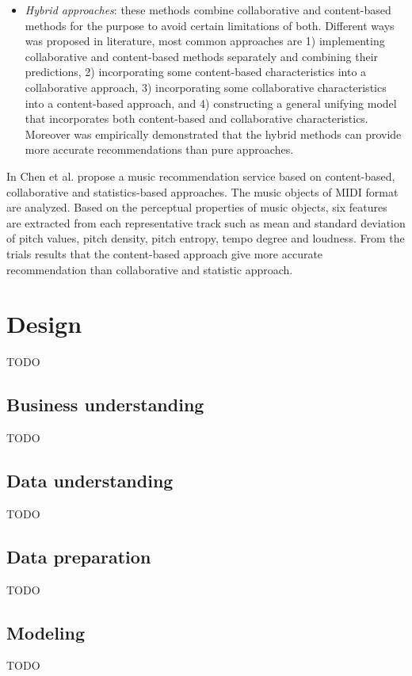 \documentclass[paper=a4, fontsize=11pt]{scrartcl} %
\numberwithin{equation}{section} %
\numberwithin{figure}{section} %
\numberwithin{table}{section} %
\begin{document}
\begin{itemize}
  \item \textit{Hybrid approaches}: these methods combine collaborative
and content-based methods for the purpose to avoid certain limitations of both.
Different ways was proposed in literature, most common approaches are 1)
implementing collaborative and content-based methods separately and combining
their predictions, 2) incorporating some content-based characteristics into a
collaborative approach, 3) incorporating some collaborative characteristics into
a content-based approach, and 4) constructing a general unifying model that
incorporates both content-based and collaborative characteristics. Moreover was
empirically demonstrated that the hybrid methods can provide more accurate
recommendations than pure approaches.
\end{itemize}

In \cite{ChenChen} Chen et al. propose a music recommendation service based on
content-based, collaborative and statistics-based approaches. The music objects
of MIDI format are analyzed. Based on the perceptual properties of music
objects, six features are extracted from each representative track such as mean
and standard deviation of pitch values, pitch density, pitch entropy, tempo
degree and loudness. From the trials results that the content-based approach
give more accurate recommendation than collaborative and statistic approach.

\section{Design}
TODO\\

\subsection{Business understanding}
TODO\\

\subsection{Data understanding}
TODO\\

\subsection{Data preparation}
TODO\\

\subsection{Modeling}
TODO\\
\end{document}
